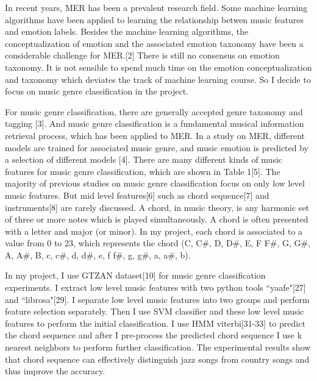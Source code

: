 \documentclass{article} %
\begin{document}
In recent years, MER has been a prevalent research field. Some machine learning algorithms have been applied to learning the relationship betwen music features and emotion labels. Besides the machine learning algorithms, the conceptualization of emotion and the associated emotion taxonomy have been a considerable challenge for MER.[2] There is still no consensus on emotion taxonomy. It is not sensible to spend much time on the emotion conceptualization and taxonomy which deviates the track of machine learning course. So I decide to focus on music genre classification in the project.

For music genre classification, there are generally accepted genre taxonomy and tagging [3]. And music genre classification is a fundamental musical information retrieval process, which has been applied to MER. In a study on MER, different models are trained for associated music genre, and music emotion is predicted by a selection of different models [4]. There are many different kinds of music features for music genre classification, which are shown in Table 1[5]. The majority of previous studies on music genre classification focus on only low level music features. But mid level features[6] such as chord sequence[7] and instruments[8] are rarely discussed. 
A chord, in music theory, is any harmonic set of three or more notes which is played simultaneously. A chord is often presented with a letter and major (or minor). In my project, each chord is associated to a value from 0 to 23, which represents the chord (C, C\#, D, D\#, E, F F\#, G, G\#, A, A\#, B, c, c\#, d, d\#, e, f f\#, g, g\#, a, a\#, b).

In my project, I use GTZAN dataset[10] for music genre classification experiments. I extract low level music features with two python tools ``yaafe"[27] and ``librosa"[29]. I separate low level music features into two groups and perform feature selection separately. Then I use SVM classifier and these low level music features to perform the initial classification. I use HMM viterbi[31-33] to predict the chord sequence and after I pre-process the predicted chord sequence I use k nearest neighbors to perform further classification. The experimental results show that chord sequence can effectively distinguish jazz songs from country songs and thus improve the accuracy.
\end{document}
